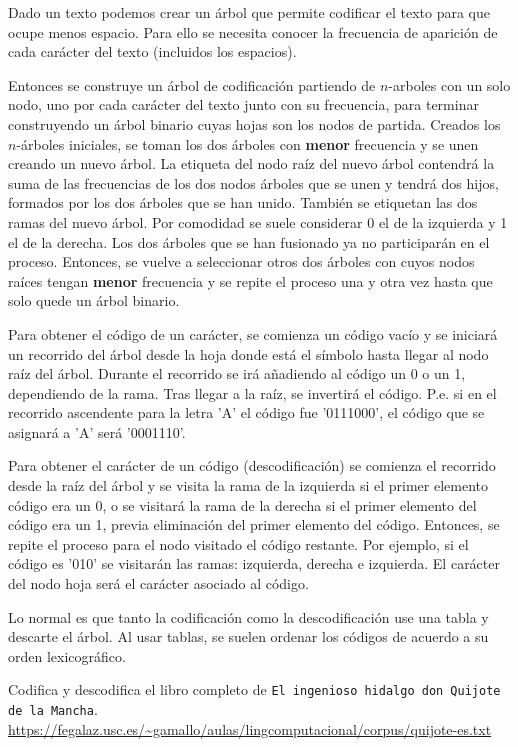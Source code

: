 Dado un texto podemos crear un árbol que permite codificar el texto para que ocupe menos espacio. Para ello se necesita conocer la frecuencia de aparición de cada carácter del texto (incluidos los espacios). 

Entonces se construye un árbol de codificación partiendo de $n$-arboles con un solo nodo, uno por cada carácter del texto junto con su frecuencia, para terminar construyendo un árbol binario cuyas hojas son los nodos de partida. Creados los $n$-árboles iniciales, se toman los dos árboles con \textbf{menor} frecuencia y se unen creando un nuevo árbol. La etiqueta del nodo raíz del nuevo árbol contendrá la suma de las frecuencias de los dos nodos árboles que se unen y tendrá dos hijos, formados por los dos árboles que se han unido. También se etiquetan las dos ramas del nuevo árbol. Por comodidad se suele considerar 0 el de la izquierda y 1 el de la derecha. Los dos árboles que se han fusionado ya no participarán en el proceso. Entonces, se vuelve a seleccionar otros dos árboles con cuyos nodos raíces tengan \textbf{menor} frecuencia y se repite el proceso una y otra vez hasta que solo quede un árbol binario. 

Para obtener el código de un carácter, se comienza un código vacío y se iniciará un recorrido del árbol desde la hoja donde está el símbolo hasta llegar al nodo raíz del árbol. Durante el recorrido se irá añadiendo al código un 0 o un 1, dependiendo de la rama. Tras llegar a la raíz, se invertirá el código. P.e. si en el recorrido ascendente para la letra 'A' el código fue '0111000', el código que se asignará a 'A' será '0001110'.

Para obtener el carácter de un código (descodificación) se comienza el recorrido desde la raíz del árbol y se visita la rama de la izquierda si el primer elemento código era un 0, o se visitará la rama de la derecha si el primer elemento del código era un 1, previa eliminación del primer elemento del código. Entonces, se repite el proceso para el nodo visitado el código restante. Por ejemplo, si el código es '010' se visitarán las ramas: izquierda, derecha e izquierda. El carácter del nodo hoja será el carácter asociado al código.

Lo normal es que tanto la codificación como la descodificación use una tabla y descarte el árbol. Al usar tablas, se suelen ordenar los códigos de acuerdo a su orden lexicográfico.

Codifica y descodifica el libro completo de \texttt{El ingenioso hidalgo don Quijote de la Mancha}.
\url{https://fegalaz.usc.es/~gamallo/aulas/lingcomputacional/corpus/quijote-es.txt}

